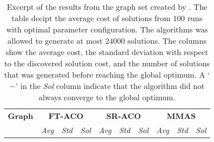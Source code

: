 \begin{table}[htbp]
   \tiny
   \caption[Excerpt of the experiment results from from the graph set created by \textcite{Monteiro2013}]{Excerpt of the results from the graph set created by \textcite{Monteiro2013}. The table decipt the average cost of solutions from 100 runs with optimal parameter configuration. The algorithms was allowed to generate at most $24000$ solutions. The columns show the average cost, the standard deviation with respect to the discovered solution cost, and the number of solutions that was generated before reaching the global optimum. A `$-$' in the \emph{Sol} column indicate that the algorithm did not always converge to the global optimum.}\label{tbl:results_table_excerpt_monteiro}
   \centering
   \renewcommand{\arraystretch}{1.2}
   
   \begin{tabular}{lrrrrrrrrr}
   \toprule
   
  \textbf{Graph} & \multicolumn{3}{c}{\textbf{FT\@{-}ACO}} & \multicolumn{3}{c}{\textbf{SR\@{-}ACO}} & \multicolumn{3}{c}{\textbf{MMAS}} \\
  \cmidrule(lr){2-4}
  \cmidrule(lr){5-7}
  \cmidrule(lr){8-10}
  & \emph{Avg} & \emph{Std} & \emph{Sol} & \emph{Avg} & \emph{Std} & \emph{Sol} & \emph{Avg} & \emph{Std} & \emph{Sol}\\
  \cmidrule(lr){2-2}
  \cmidrule(lr){3-3}
  \cmidrule(lr){4-4}
  \cmidrule(lr){5-5}
  \cmidrule(lr){6-6}
  \cmidrule(lr){7-7}
  \cmidrule(lr){8-8}
  \cmidrule(lr){9-9}
  \cmidrule(lr){10-10}
  

\end{tabular}
\end{table}

